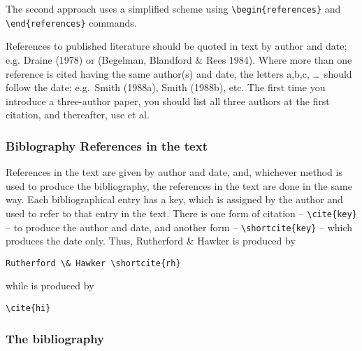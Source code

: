 \documentclass{gji}
\begin{document}
The second approach uses a simplified scheme using
\verb"\begin{references}" and \verb"\end{references}" commands.

References to published literature should be quoted in text by author
and date; e.g. Draine (1978) or (Begelman, Blandford \& Rees 1984).
Where more than one reference is cited having the same author(s) and date,
the letters a,b,c, \ldots\ should follow the date; e.g.\ Smith (1988a),
Smith (1988b), etc.
The first time you introduce a three-author paper, you should list all
three authors at the first citation, and thereafter, use et al.

\subsubsection{Biblography References in the text}

References in the text are given by author and date, and, whichever
method is used to produce the bibliography, the references in the text
are done in the same way. Each bibliographical entry has a key, which
is assigned by the author and used to refer to that entry in the text.
There is one form of citation -- \verb"\cite{key}" -- to produce the
author and date, and another form -- \verb"\shortcite{key}" -- which
produces the date only. Thus, Rutherford \& Hawker  is
produced by
\begin{verbatim}
Rutherford \& Hawker \shortcite{rh}
\end{verbatim}
while \cite{hi} is produced by
\begin{verbatim}
\cite{hi}
\end{verbatim}

\subsubsection{The bibliography}
\end{document}
